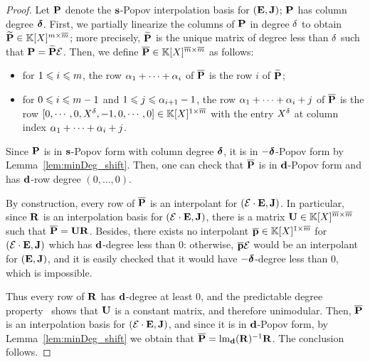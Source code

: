 \documentclass[preprint]{sig-alternate-05-2015}
\begin{document}
\begin{proof}
  Let $\intBasis$ denote the $\shifts$-Popov interpolation basis for
  $(\evMat,\mulmat)$; $\intBasis$ has column degree $\minDegs$. First, we
  partially linearize the columns of $\intBasis$ in degree $\degExp$ to obtain
  $\widetilde{\intBasis} \in \polMatSpace[\rdim][\expand{\rdim}]$; more
  precisely, $\widetilde{\intBasis}$ is the unique matrix of degree less than
  $\degExp$ such that $\intBasis = \widetilde{\intBasis} \expandMat$.
  Then, we define $\expand{\intBasis} \in \polMatSpace[\expand{\rdim}]$ as
  follows:
  \begin{itemize}
    \item for $1\le i \le \rdim$, the row $\quoExp_1 + \cdots + \quoExp_i$ of $\expand{\mat{P}}$ is the
      row $i$ of $\widetilde{\intBasis}$;
    \item for $0\le i \le \rdim-1$ and $1 \le j \le \quoExp_{i+1}-1$, the row
      $\quoExp_1 + \cdots + \quoExp_i + j$ of $\expand{\intBasis}$ is the row
      $[ 0, \cdots, 0, X^\degExp, -1, 0, \cdots, 0] \in
      \polMatSpace[1][\expand{\rdim}]$ with the entry $X^\degExp$ at column
      index $\quoExp_1 + \cdots + \quoExp_i + j$.
  \end{itemize}
  Since $\intBasis$ is in $\shifts$-Popov form with column degree $\minDegs$,
  it is in $-\minDegs$-Popov form by Lemma~\ref{lem:minDeg_shift}. Then, one
  can check that $\expand{\intBasis}$ is in $\shifts[d]$-Popov form and has
  $\shifts[d]$-row degree $(0,\ldots,0)$.

  By construction, every row of $\expand{\intBasis}$ is an interpolant for
  $(\expandMat \mul \evMat,\mulmat)$. In particular, since $\mat{R}$ is an
  interpolation basis for $(\expandMat \mul \evMat,\mulmat)$, there is a matrix
  $\mat{U} \in \polMatSpace[\expand{\rdim}]$ such that $\expand{\intBasis} =
  \mat{U} \mat{R}$. Besides, there exists no interpolant $\expand{\row{p}} \in
  \polMatSpace[1][\expand{\rdim}]$ for $(\expandMat \mul \evMat,\mulmat)$ which
  has $\shifts[d]$-degree less than $0$: otherwise, $\expand{\row{p}}
  \expandMat$ would be an interpolant for $(\evMat,\mulmat)$, and it is easily
  checked that it would have $-\minDegs$-degree less than $0$, which is
  impossible.
  
  Thus every row of $\mat{R}$ has $\shifts[d]$-degree at least $0$, and the
  predictable degree property~\cite[Theorem~6.3.13]{Kailath80} shows that
  $\mat{U}$ is a constant matrix, and therefore unimodular. Then,
  $\expand{\intBasis}$ is an interpolation basis for $(\expandMat \mul
  \evMat,\mulmat)$, and since it is in $\shifts[d]$-Popov form, by
  Lemma~\ref{lem:minDeg_shift} we obtain that $\expand{\intBasis} =
  \leadingMat[{\shifts[d]}]{\mat{R}}^{-1} \mat{R}$. The conclusion follows.
\end{proof}
\end{document}
